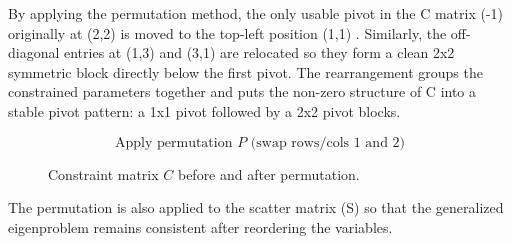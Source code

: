 \documentclass[11pt,a4paper]{article}
\begin{document}
By applying the permutation method, the only usable pivot in the C matrix (-1) originally at (2,2) is moved to the top-left position (1,1) . Similarly, the off-diagonal entries at (1,3) and (3,1) are relocated so they form a clean 2x2 symmetric block directly below the first pivot. The rearrangement groups the constrained parameters together and puts the non-zero structure of C into a stable pivot pattern: a 1x1 pivot followed by a 2x2 pivot blocks. 

\begin{figure}[h!]
\centering


\vspace{0.5cm}

\[
\text{Apply permutation } P \text{ (swap rows/cols 1 and 2)}
\]

\vspace{0.5cm}


\caption{Constraint matrix $C$ before and after permutation.}
\end{figure}

The permutation is also applied to the scatter matrix (S) so that the generalized eigenproblem remains consistent after reordering the variables. 
\end{document}
